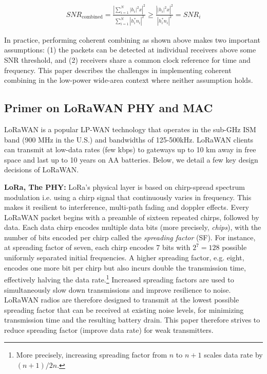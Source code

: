\begin{align*}
SNR_{\text{combined}} %
	= \frac{\left| \sum_{i=1}^N \left| h_i \right|^2 x \right|^2}{\sum_{i=1}^N \left| h^*_i n_i \right|^2} 
	\geq \frac{\left| \left| h_i \right|^2 x \right|^2}{\left| h^*_i n_i \right|^2} = SNR_i
\end{align*}

In practice, performing coherent combining as shown above makes two important
assumptions: (1) the packets can be detected at individual receivers above
some SNR threshold, and (2) receivers share a common clock reference for time
and frequency. This paper describes the challenges in implementing coherent
combining in the low-power wide-area context where neither assumption holds.


\subsection{Primer on LoRaWAN PHY and MAC}
\label{sec:lora}

LoRaWAN is a popular LP-WAN technology that operates in the sub-GHz ISM band
(900 MHz in the U.S.) and bandwidths of 125-500kHz. LoRaWAN clients can
transmit at low-data rates (few kbps) to gateways up to 10 km away in free
space and last up to 10 years on AA batteries. Below, we detail a few key
design decisions of LoRaWAN.

\noindent \textbf{LoRa, The PHY: } LoRa's physical layer is based on
chirp-spread spectrum modulation i.e. using a chirp signal that continuously
varies in frequency. This makes it resilient to interference, multi-path
fading and doppler effects. Every LoRaWAN packet begins with a preamble of
sixteen repeated chirps, followed by data. Each data chirp encodes multiple
data bits (more precisely, \textit{chips}), with the number of  bits encoded
per chirp called the \textit{spreading factor} (SF). For instance, at
spreading factor of seven, each chirp encodes 7 bits with $2^7 = 128$ possible
uniformly separated initial frequencies. A higher spreading factor, e.g.
eight, encodes one more bit per chirp but also incurs double the transmission
time, effectively halving the data rate.\footnote{More precisely, increasing
spreading factor from $n$ to $n+1$ scales data rate by $(n+1)/2n$.} Increased
spreading factors are used to simultaneously slow down transmissions and
improve resilience to noise. LoRaWAN radios are therefore designed to transmit
at the lowest possible spreading factor that can be received at existing noise
levels, for minimizing transmission time and the resulting battery drain. This
paper therefore strives to reduce spreading factor (improve data rate) for
weak transmitters.

